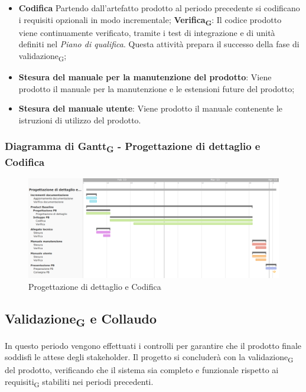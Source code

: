 \:
\begin{itemize}
	\item \textbf{Codifica} Partendo dall'artefatto prodotto al periodo precedente si codificano i requisiti opzionali in modo incrementale;
	\subitem \textbf{Verifica\textsubscript{G}}: Il codice prodotto viene continuamente verificato, tramite i test di integrazione e di unità definiti nel \textit{Piano di qualifica}. Questa attività prepara il successo della fase di validazione\textsubscript{G};
	\item \textbf{Stesura del manuale per la manutenzione del prodotto}: Viene prodotto il manuale per la manutenzione e le estensioni future del prodotto;
	\item \textbf{Stesura del manuale utente}: Viene prodotto il manuale contenente le istruzioni di utilizzo del prodotto.
\end{itemize}
\subsubsection{Diagramma di Gantt\textsubscript{G} - Progettazione di dettaglio e Codifica}

\begin{figure}[H]
\centering
\includegraphics[width=\textwidth]{img/4_codifica.png}
\caption{Progettazione di dettaglio e Codifica}
\end{figure}

\newpage
\subsection{Validazione\textsubscript{G} e Collaudo}
In questo periodo vengono effettuati i controlli per garantire che il prodotto finale soddisfi le attese degli stakeholder. Il progetto si concluderà con la validazione\textsubscript{G} del prodotto, verificando che il sistema sia completo e funzionale rispetto ai requisiti\textsubscript{G} stabiliti nei periodi precedenti.


